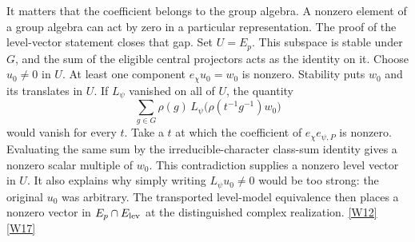 \documentclass[12pt,letterpaper]{article}
\begin{document}
It matters that the coefficient belongs to the group algebra. A nonzero element of a group algebra can act by zero in a particular representation. The proof of the level-vector statement closes that gap. Set \(U=E_p\). This subspace is stable under \(G\), and the sum of the eligible central projectors acts as the identity on it. Choose \(u_0\ne0\) in \(U\). At least one component \(e_\chi u_0=w_0\) is nonzero. Stability puts \(w_0\) and its translates in \(U\). If \(L_\psi\) vanished on all of \(U\), the quantity
\[
       \sum_{g\in G}\rho(g)\,
             L_\psi\bigl(\rho(t^{-1}g^{-1})w_0\bigr)
\]
would vanish for every \(t\). Take a \(t\) at which the coefficient of \(e_\chi e_{\psi,P}\) is nonzero. Evaluating the same sum by the irreducible-character class-sum identity gives a nonzero scalar multiple of \(w_0\). This contradiction supplies a nonzero level vector in \(U\). It also explains why simply writing \(L_\psi u_0\ne0\) would be too strong: the original \(u_0\) was arbitrary. The transported level-model equivalence then places a nonzero vector in \(E_p\cap E_{\rm lev}\) at the distinguished complex realization. \href{https://github.com/nousentllc/riemann-hypothesis/blob/40e56bab026552e089d7afcfeff08d2defb9c005/src/Development/AbelianVarietyTheory/Proofs/IwasawaDecomposition/ExistsBaseLevelRowOfNonzeroGoodRowsPart.lean#L19-L29}{\textsf{[W12]}} \href{https://github.com/nousentllc/riemann-hypothesis/blob/40e56bab026552e089d7afcfeff08d2defb9c005/src/Development/AbelianVarietyTheory/Proofs/SatakeParameters/ExistsLevelVectorGoodTypeStableSubspace.lean#L99-L202}{\textsf{[W17]}}
\end{document}

